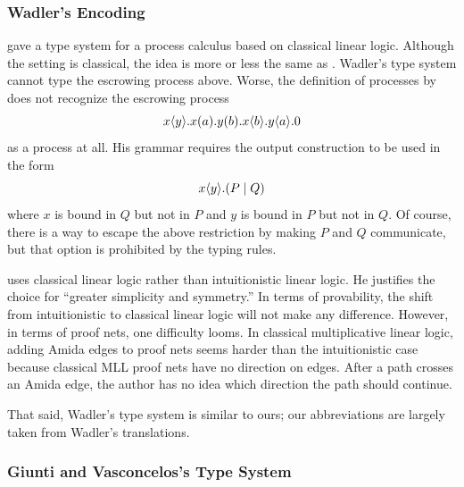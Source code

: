 \subsubsection{Wadler's Encoding}

\citet{wadler2012propositions} gave a type system for a process
calculus based on classical linear logic.
Although the setting is classical, the idea is more or less the same as
\citet{pfenning2010}.
Wadler's type system cannot type the escrowing process above.
Worse, the definition of processes by \citet{wadler2012propositions}
does not recognize the escrowing process
\[
 {x}\langle{y}\rangle.{{{x}({a}).{{{y}({b}).{{x}\langle{b}\rangle.{{y}\langle{a}\rangle.{0}}}}}}}
\]
as a process at all.
His grammar requires the output construction to be used in the form
\[
 {x}\langle{y}\rangle.{(P\mid Q)}
\]
where $x$ is bound in $Q$ but not in $P$ and $y$ is bound in $P$ but not
in $Q$.
Of course, there is a way to escape the above restriction by making $P$
and $Q$ communicate, but that option is prohibited by the typing rules.

\citet{wadler2012propositions} uses classical linear logic rather than
intuitionistic linear
logic.
He justifies the choice for ``greater simplicity and symmetry.''
In terms of provability, the shift from intuitionistic to classical
linear logic will not make any difference.  However, in terms of proof nets,
one difficulty looms.  In classical multiplicative linear logic,
adding Amida edges to proof nets seems harder than the intuitionistic case
because classical MLL proof nets have no direction on edges.
After a path crosses an Amida edge, the author has no idea which
direction the path should continue.

That said,
Wadler's type system is similar to ours;
our abbreviations are largely taken from Wadler's translations.

\subsubsection{Giunti and Vasconcelos's Type System}

